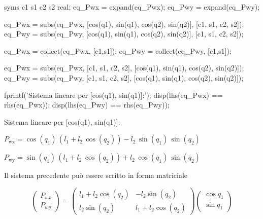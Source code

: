 \documentclass[11pt, a4paper]{article}
\begin{document}
\begin{matlabcode}
syms c1 s1 c2 s2 real;
eq_Pwx = expand(eq_Pwx);
eq_Pwy = expand(eq_Pwy);

eq_Pwx = subs(eq_Pwx, [cos(q1), sin(q1), cos(q2), sin(q2)], [c1, s1, c2, s2]);
eq_Pwy = subs(eq_Pwy, [cos(q1), sin(q1), cos(q2), sin(q2)], [c1, s1, c2, s2]);

eq_Pwx = collect(eq_Pwx, [c1,s1]);
eq_Pwy = collect(eq_Pwy, [c1,s1]);

eq_Pwx = subs(eq_Pwx, [c1, s1, c2, s2], [cos(q1), sin(q1), cos(q2), sin(q2)]);
eq_Pwy = subs(eq_Pwy, [c1, s1, c2, s2], [cos(q1), sin(q1), cos(q2), sin(q2)]);

fprintf('Sistema lineare per [cos(q1), sin(q1)]:\n');
disp(lhs(eq_Pwx) == rhs(eq_Pwx));
disp(lhs(eq_Pwy) == rhs(eq_Pwy));
\end{matlabcode}
\begin{matlaboutput}
Sistema lineare per [cos(q1), sin(q1)]:
\end{matlaboutput}
\begin{matlabsymbolicoutput}
$\displaystyle P_{\textrm{wx}} =\cos \left(q_1 \right)\,{\left(l_1 +l_2 \,\cos \left(q_2 \right)\right)}-l_2 \,\sin \left(q_1 \right)\,\sin \left(q_2 \right)$
\end{matlabsymbolicoutput}
\begin{matlabsymbolicoutput}
$\displaystyle P_{\textrm{wy}} =\sin \left(q_1 \right)\,{\left(l_1 +l_2 \,\cos \left(q_2 \right)\right)}+l_2 \,\cos \left(q_1 \right)\,\sin \left(q_2 \right)$
\end{matlabsymbolicoutput}
\newpage
\begin{par}
\begin{flushleft}
Il sistema precedente può essere scritto in forma matriciale
\end{flushleft}
\end{par}

\[
    \left(\begin{array}{c}
    P_{wx} \\
    P_{wy}
    \end{array}\right)=\left(\begin{array}{cc}
    l_1 +l_2 \cos(q_2 ) & -l_2 \sin (q_2 )\\
    l_2 \sin (q_2 ) & l_1 +l_2 \cos(q_2 )
    \end{array}\right)\left(\begin{array}{c}
    \cos q_1 \\
    \sin q_1
    \end{array}\right)
\]
\end{document}
